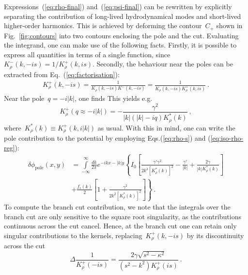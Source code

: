\documentclass[preprint,aps,eqsecnum, prb]{revtex4-1}
\newcommand{\fplus}[1]{{#1}^{+}}
\newcommand{\fminus}[1]{{#1}^{-}}
\begin{document}
Expressions~(\ref{eq:rho-final}) and~(\ref{eq:psi-final}) can be
rewritten by explicitly separating the contribution of long-lived
hydrodynamical modes and short-lived higher-order harmonics. This
is achieved by deforming the contour~$C_{+}$ shown in Fig.~\ref{fig:contours}
into two contours enclosing the pole and the cut. Evaluating
the integrand, one can make use of the following facts.
Firstly,
it is possible to express all quantities in terms of a single function,
since~$\fminus{K}_\rho(k, -is) = 1/\fplus{K}_\rho(k, is)$.  Secondly,
the behaviour near the poles can be extracted from
Eq.~(\ref{eq:factorisation}):
\begin{align}
  \fplus{K}_\rho(k, -is) = \frac{1}{K_\rho(k, -is) \fminus{K}(k, -is)}
  = \frac{1}{K_\rho(k, -is) \fplus{K}_\rho(k, is)}\ . 
\end{align}
Near the pole~$q = -i|k|$, one finds
This yields e.g. 
\begin{equation}
 \fplus{K}_\rho (q \approx -i |k|)
 = - \frac{\gamma^2}{|k|(|k| - i q) K_\rho^\ast(k)}
 \ ,
\end{equation}
where~$K_\rho^\ast(k) \equiv \fplus{K}_\rho(k, i|k|)$ as usual.
With this in mind, one can write the pole contribution
to the potential by employing Eqs.(\ref{eq:rho-s}) and (\ref{eq:iso-rho-reg}):
\begin{align}
  \label{eq:Krho-pole}
\delta \phi_\mathrm{pole}(x, y)
&= \int\limits_{-\infty}^{\infty}\frac{dk}{2\pi} e^{-ikx - |k| y}
\left\{I_0 \left[
\frac{\gamma'\gamma^2}{2k^3 \left[K_\rho^\ast(k)\right]^2}
- \frac{\gamma'}{|k|}
+ \frac{2\gamma}{|k| K_\rho^\ast(k)}\right] \right. \\\nonumber
  &+ \left.\frac{f_s(k)}{2} \left[1 + \frac{\gamma^2}{2 k^2
  \left[K_\rho^\ast(k)\right]^2} \right]
\right\} \ .
\end{align}
To compute the branch cut contribution,  we note that
the  integrals over the branch cut are only sensitive
to the square root singularity, as the contributions continuous
across the cut cancel.
Hence, at the branch cut one can retain only singular contributions
to the kernels, replacing~$\fplus{K}_\rho(k, -is)$ by
its discontinuity across the cut
\begin{equation}
 \label{eq:Krho-discont}
 \Delta \frac{1}{\fplus{K}_\rho (-is)} = 
  \frac{2\gamma\sqrt{s^2 - \kappa^2}}{(s^2 - k^2) \fplus{K}_\rho(is)}
 \ .
\end{equation}
\end{document}
